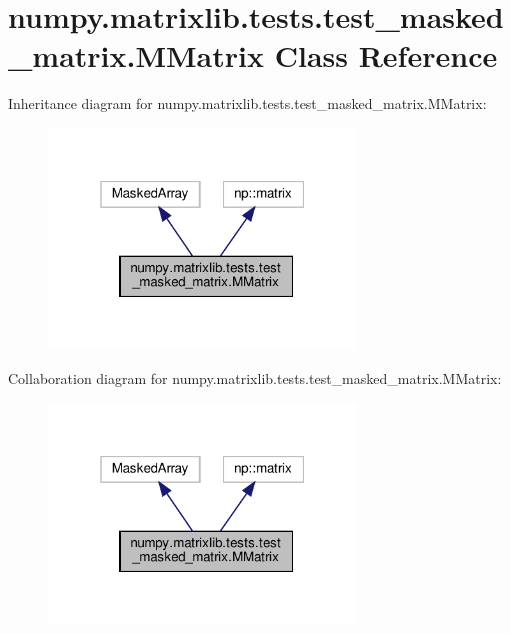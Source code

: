 \hypertarget{classnumpy_1_1matrixlib_1_1tests_1_1test__masked__matrix_1_1MMatrix}{}\section{numpy.\+matrixlib.\+tests.\+test\+\_\+masked\+\_\+matrix.\+M\+Matrix Class Reference}
\label{classnumpy_1_1matrixlib_1_1tests_1_1test__masked__matrix_1_1MMatrix}


Inheritance diagram for numpy.\+matrixlib.\+tests.\+test\+\_\+masked\+\_\+matrix.\+M\+Matrix\+:
\nopagebreak
\begin{figure}[H]
\begin{center}
\leavevmode
\includegraphics[width=232pt]{classnumpy_1_1matrixlib_1_1tests_1_1test__masked__matrix_1_1MMatrix__inherit__graph}
\end{center}
\end{figure}


Collaboration diagram for numpy.\+matrixlib.\+tests.\+test\+\_\+masked\+\_\+matrix.\+M\+Matrix\+:
\nopagebreak
\begin{figure}[H]
\begin{center}
\leavevmode
\includegraphics[width=232pt]{classnumpy_1_1matrixlib_1_1tests_1_1test__masked__matrix_1_1MMatrix__coll__graph}
\end{center}
\end{figure}
